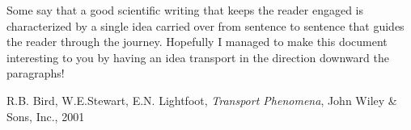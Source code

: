 \documentclass[10pt,twocolumn]{article}
\begin{document}
Some say that a good scientific writing that keeps the reader engaged is characterized by a single idea carried over from sentence to sentence that guides the reader through the journey. Hopefully I managed to make this document interesting to you by having an idea transport in the direction downward the paragraphs!


















\thebibliography{}

 R.B. Bird, W.E.Stewart, E.N. Lightfoot, \textit{Transport Phenomena}, John Wiley \& Sons, Inc., 2001
\end{document}
